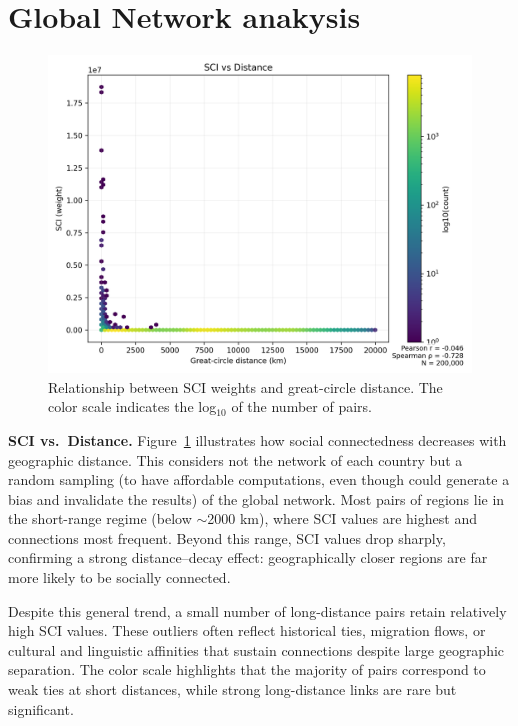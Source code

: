 \section{Global Network anakysis}
\begin{figure}[h!]
    \centering
    \includegraphics[width=0.65\linewidth]{images/TASK3/global_distance_vs_sci.png}
    \caption{Relationship between SCI weights and great-circle distance. The color scale indicates the log$_{10}$ of the number of pairs.}
    \label{fig:distance}
\end{figure}

\textbf{SCI vs.\ Distance.}  
Figure~\ref{fig:distance} illustrates how social connectedness decreases with geographic distance.
This considers not the network of each country but a random sampling (to have affordable computations, even though could generate a bias and invalidate the results) of the global network.
Most pairs of regions lie in the short-range regime (below $\sim$2000 km), where SCI values are highest and connections most frequent.  
Beyond this range, SCI values drop sharply, confirming a strong distance–decay effect: geographically closer regions are far more likely to be socially connected.  

Despite this general trend, a small number of long-distance pairs retain relatively high SCI values.  
These outliers often reflect historical ties, migration flows, or cultural and linguistic affinities that sustain connections despite large geographic separation.  
The color scale highlights that the majority of pairs correspond to weak ties at short distances, while strong long-distance links are rare but significant.
